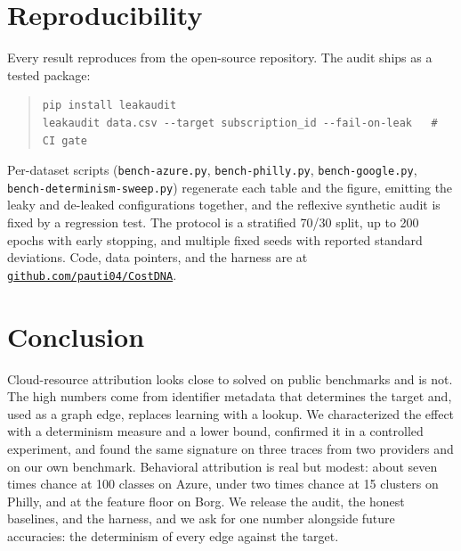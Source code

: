\documentclass[11pt]{article}
\newcommand{\code}[1]{\texttt{#1}}
\begin{document}
\section{Reproducibility}
\label{sec:repro}

Every result reproduces from the open-source repository. The audit ships as a
tested package:
\begin{quote}
\begin{verbatim}
pip install leakaudit
leakaudit data.csv --target subscription_id --fail-on-leak   # CI gate
\end{verbatim}
\end{quote}
Per-dataset scripts (\code{bench-azure.py}, \code{bench-philly.py},
\code{bench-google.py}, \code{bench-determinism-sweep.py}) regenerate each table
and the figure, emitting the leaky and de-leaked configurations together, and
the reflexive synthetic audit is fixed by a regression test. The protocol is a
stratified 70/30 split, up to 200 epochs with early stopping, and multiple
fixed seeds with reported standard deviations. Code, data pointers, and the
harness are at
\href{https://github.com/pauti04/CostDNA}{\code{github.com/pauti04/CostDNA}}.

\section{Conclusion}

Cloud-resource attribution looks close to solved on public benchmarks and is
not. The high numbers come from identifier metadata that determines the target
and, used as a graph edge, replaces learning with a lookup. We characterized the
effect with a determinism measure and a lower bound, confirmed it in a
controlled experiment, and found the same signature on three traces from two
providers and on our own benchmark. Behavioral attribution is real but modest:
about seven times chance at 100 classes on Azure, under two times chance at 15
clusters on Philly, and at the feature floor on Borg. We release the audit, the
honest baselines, and the harness, and we ask for one number alongside future
accuracies: the determinism of every edge against the target.
\end{document}
